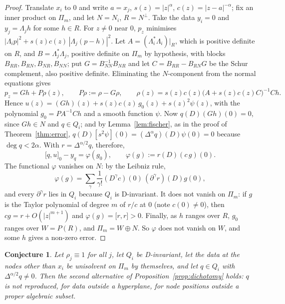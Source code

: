 \documentclass[12pt]{amsart}
\newtheorem{conjecture}[theorem]{Conjecture}
\theoremstyle{definition}
\theoremstyle{remark}
\newcommand{\Pm}{\Pi_m}
\newcommand{\fp}[2]{\bigl[#1,#2\bigr]}          %
\newcommand{\fpz}[3]{\bigl[#1,#2\bigr]_{#3}}     %
\begin{document}
\begin{proof}
Translate $x_i$ to $0$ and write $a=x_j$, $s(z)=|z|^\alpha$, $c(z)=|z-a|^{-\alpha}$; fix an inner
product on $\Pm$, and let $N=N_i$, $R=N^\perp$. Take the data $y_i=0$ and $y_j=\Lambda_jh$ for
some $h\in R$. For $z\ne0$ near $0$, $p_z$ minimises
$|\Lambda_ip|^2+s(z)c(z)\,|\Lambda_j(p-h)|^2$. Let $A=(\Lambda_i^*\Lambda_i)|_R$, which is positive
definite on $R$, and $B=\Lambda_j^*\Lambda_j$, positive definite on $\Pm$ by hypothesis, with
blocks $B_{RR},B_{RN},B_{NR},B_{NN}$; put $G=B_{NN}^{-1}B_{NR}$ and let
$C=B_{RR}-B_{RN}G$ be the Schur complement, also positive definite. Eliminating the $N$-component
from the normal equations gives
\[
  p_z=Gh+P\rho(z),\qquad P\rho:=\rho-G\rho,\qquad
  \rho(z)=s(z)c(z)\bigl(A+s(z)c(z)C\bigr)^{-1}Ch .
\]
Hence $u(z)=(Gh)(z)+s(z)c(z)\,g_0(z)+s(z)^2\psi(z)$, with the polynomial $g_0=PA^{-1}Ch$ and a
smooth function $\psi$. Now $q(D)(Gh)(0)=0$, since $Gh\in N$ and $q\in Q_i$; and by
Lemma~\ref{lem:fischer}, as in the proof of Theorem~\ref{thm:error},
$q(D)[s^2\psi](0)=(\Delta^\alpha q)(D)\psi(0)=0$ because $\deg q<2\alpha$. With
$r=\Delta^{\alpha/2}q$, therefore,
\[
  \fpz{q}{u}{0}-y_q=\varphi(g_0),\qquad \varphi(g):=r(D)(c\,g)(0).
\]
The functional $\varphi$ vanishes on $N$: by the Leibniz rule,
\[
  \varphi(g)=\sum_\gamma\frac1{\gamma!}(D^\gamma c)(0)\,(\partial^\gamma r)(D)g(0),
\]
and every
$\partial^\gamma r$ lies in $Q_i$ because $Q_i$ is D-invariant. It does not vanish on $\Pm$: if
$g$ is the Taylor polynomial of degree $m$ of $r/c$ at $0$ (note $c(0)\ne0$), then
$cg=r+O(|z|^{m+1})$ and $\varphi(g)=\fp{r}{r}>0$. Finally, as $h$ ranges over $R$, $g_0$ ranges
over $W=P(R)$, and $\Pm=W\oplus N$. So $\varphi$ does not vanish on $W$, and some $h$ gives a
non-zero error.
\end{proof}

\begin{conjecture}\label{conj:char}
Let $\rho_j\equiv1$ for all $j$, let $Q_i$ be D-invariant, let the data at the nodes other than
$x_i$ be unisolvent on $\Pm$ by themselves, and let $q\in Q_i$ with $\Delta^{\alpha/2}q\ne0$. Then
the second alternative of Proposition~\ref{prop:dichotomy} holds: $q$ is not reproduced, for
data outside a hyperplane, for node positions outside a proper algebraic subset.
\end{conjecture}
\end{document}
